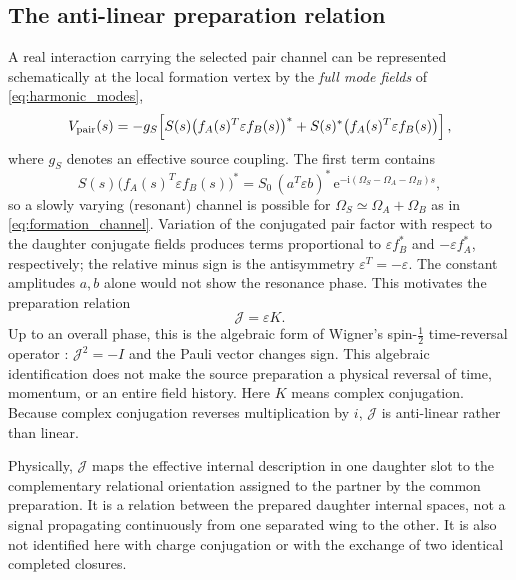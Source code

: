 \documentclass[11pt]{article}
\theoremstyle{remark}
\newcommand{\ii}{\mathrm{i}}
\newcommand{\ee}{\mathrm{e}}
\newcommand{\epsm}{\varepsilon}
\newcommand{\Jmap}{\mathcal J}
\begin{document}
\subsection{The anti-linear preparation relation}

A real interaction carrying the selected pair channel can be represented schematically
at the local formation vertex by the \emph{full mode fields} of
\eqref{eq:harmonic_modes},
\begin{equation}
  V_{\rm pair}(s)
  =-g_S\!\left[
  S(s)\bigl(f_A(s)^T\epsm f_B(s)\bigr)^*
  +S(s)^*\bigl(f_A(s)^T\epsm f_B(s)\bigr)
  \right],
  \label{eq:pair_interaction}
\end{equation}
where \(g_S\) denotes an effective source coupling.  The first term contains
\begin{equation}
  S(s)\bigl(f_A(s)^T\epsm f_B(s)\bigr)^*
  =S_0\,(a^T\epsm b)^*\,
    \ee^{-\ii(\Omega_S-\Omega_A-\Omega_B)s},
  \label{eq:pair_phase}
\end{equation}
so a slowly varying (resonant) channel is possible for
\(\Omega_S\simeq\Omega_A+\Omega_B\) as in \eqref{eq:formation_channel}.
Variation of the conjugated pair factor with respect to the daughter conjugate
fields produces terms proportional to \(\epsm f_B^*\) and
\(-\epsm f_A^*\), respectively; the relative minus sign is the
antisymmetry \(\epsm^T=-\epsm\).  The constant amplitudes \(a,b\) alone
would not show the resonance phase.  This motivates the preparation relation
\begin{equation}
  \boxed{\Jmap=\epsm K.}
  \label{eq:Jmap}
\end{equation}
Up to an overall phase, this is the algebraic form of Wigner's
spin-$\tfrac12$ time-reversal operator \cite{Wigner1932TimeReversal}:
$\Jmap^2=-I$ and the Pauli vector changes sign.  This algebraic
identification does not make the source preparation a physical reversal
of time, momentum, or an entire field history.
Here \(K\) means complex conjugation.  Because complex conjugation reverses multiplication by
\(i\), \(\Jmap\) is anti-linear rather than linear.

Physically, \(\Jmap\) maps the effective internal description in one daughter slot to the
complementary relational orientation assigned to the partner by the common preparation.  It is a
relation between the prepared daughter internal spaces, not a signal propagating continuously from
one separated wing to the other.  It is also not identified here with charge conjugation or with the
exchange of two identical completed closures.
\end{document}
